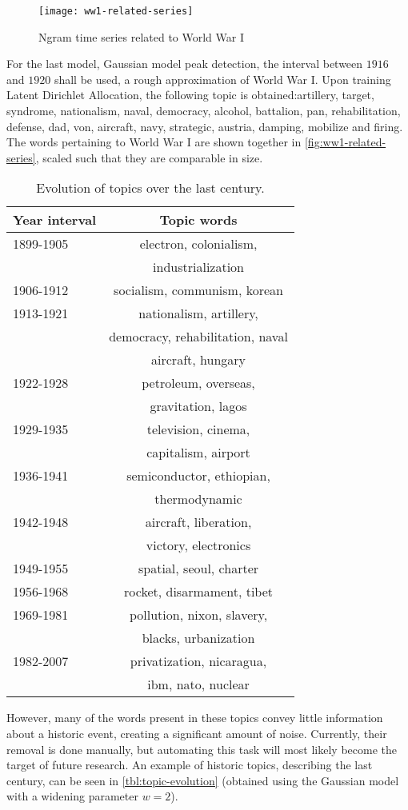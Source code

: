 \begin{figure}
\centering
\texttt{[image: ww1-related-series]}
\caption{Ngram time series related to World War I}
\label{fig:ww1-related-series}
\end{figure}

For the last model, Gaussian model peak detection, the interval between $1916$ and $1920$ shall be used, a rough approximation of World War I. Upon training Latent Dirichlet Allocation, the following topic is obtained:artillery, target, syndrome, nationalism, naval, democracy, alcohol, battalion, pan, rehabilitation, defense, dad, von, aircraft, navy, strategic, austria, damping, mobilize and firing. The words pertaining to World War I are shown together in \autoref{fig:ww1-related-series}, scaled such that they are comparable in size.

\begin{table}[h]
\begin{center}
\begin{tabular}{lc}
\toprule
\bf Year interval & \bf Topic words \\
\midrule
1899-1905 & electron, colonialism, \\
	& industrialization \\
1906-1912 & socialism, communism, korean \\
1913-1921 & nationalism, artillery, \\
	& democracy, rehabilitation, naval \\
	& aircraft, hungary \\
1922-1928 & petroleum, overseas, \\
	& gravitation, lagos \\
1929-1935 & television, cinema, \\
	& capitalism, airport \\
1936-1941 & semiconductor, ethiopian, \\
	& thermodynamic \\
1942-1948 & aircraft, liberation, \\
	& victory, electronics \\
1949-1955 & spatial, seoul, charter \\
1956-1968 & rocket, disarmament, tibet \\
1969-1981 & pollution, nixon, slavery, \\
	& blacks, urbanization \\
1982-2007 & privatization, nicaragua, \\
	& ibm, nato, nuclear \\
\bottomrule
\end{tabular}
\end{center}
\caption{\label{tbl:topic-evolution} Evolution of topics over the last century. }
\end{table}

However, many of the words present in these topics convey little information about a historic event, creating a significant amount of noise. Currently, their removal is done manually, but automating this task will most likely become the target of future research. An example of historic topics, describing the last century, can be seen in \autoref{tbl:topic-evolution} (obtained using the Gaussian model with a widening parameter $w = 2$).

